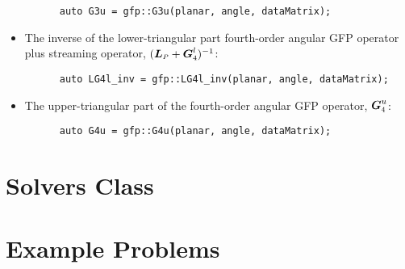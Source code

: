 \documentclass[../main.tex]{subfiles}
\begin{document}
\begin{itemize}
    \begin{verbatim}
      auto G3u = gfp::G3u(planar, angle, dataMatrix);
    \end{verbatim}
    \item The inverse of the lower-triangular part fourth-order angular GFP operator plus streaming operator, $(\Lp+\Gfour^l)^{-1}$:
    \begin{verbatim}
      auto LG4l_inv = gfp::LG4l_inv(planar, angle, dataMatrix);
    \end{verbatim}
    \item The upper-triangular part of the fourth-order angular GFP operator, $\Gfour^u$:
    \begin{verbatim}
      auto G4u = gfp::G4u(planar, angle, dataMatrix);
    \end{verbatim}
\end{itemize}

\section{Solvers Class}

\section{Example Problems}
\end{document}
